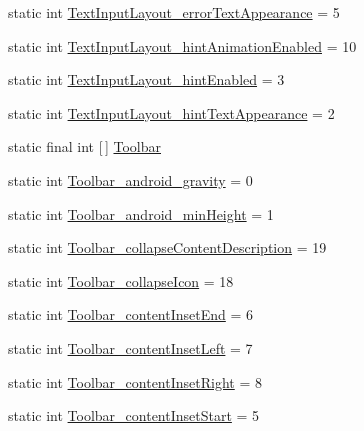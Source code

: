 \begin{DoxyCompactItemize}
static int \hyperlink{classandroid_1_1support_1_1v7_1_1mediarouter_1_1R_1_1styleable_ae6737e6924f3c3da1826890fae0f258b}{Text\+Input\+Layout\+\_\+error\+Text\+Appearance} = 5
\item 
static int \hyperlink{classandroid_1_1support_1_1v7_1_1mediarouter_1_1R_1_1styleable_ac0c7f954fdab6a754ad01fdbc4aeb6ca}{Text\+Input\+Layout\+\_\+hint\+Animation\+Enabled} = 10
\item 
static int \hyperlink{classandroid_1_1support_1_1v7_1_1mediarouter_1_1R_1_1styleable_a3a615e7612252cf50e0e7e212dae5195}{Text\+Input\+Layout\+\_\+hint\+Enabled} = 3
\item 
static int \hyperlink{classandroid_1_1support_1_1v7_1_1mediarouter_1_1R_1_1styleable_ab6a59dd02f3aa6519088694189ebef61}{Text\+Input\+Layout\+\_\+hint\+Text\+Appearance} = 2
\item 
static final int \mbox{[}$\,$\mbox{]} \hyperlink{classandroid_1_1support_1_1v7_1_1mediarouter_1_1R_1_1styleable_a6815cdfaadde30c82b955863af196899}{Toolbar}
\item 
static int \hyperlink{classandroid_1_1support_1_1v7_1_1mediarouter_1_1R_1_1styleable_a3d2dddda90688124695406ed25e401e5}{Toolbar\+\_\+android\+\_\+gravity} = 0
\item 
static int \hyperlink{classandroid_1_1support_1_1v7_1_1mediarouter_1_1R_1_1styleable_a22666f41befa7bb4b75c5c670e5cc5ce}{Toolbar\+\_\+android\+\_\+min\+Height} = 1
\item 
static int \hyperlink{classandroid_1_1support_1_1v7_1_1mediarouter_1_1R_1_1styleable_a9ee92a8c7ef0336e84eb2c6ea27db9d6}{Toolbar\+\_\+collapse\+Content\+Description} = 19
\item 
static int \hyperlink{classandroid_1_1support_1_1v7_1_1mediarouter_1_1R_1_1styleable_a93c3561c7efd4ac1f04f5d87f57da44e}{Toolbar\+\_\+collapse\+Icon} = 18
\item 
static int \hyperlink{classandroid_1_1support_1_1v7_1_1mediarouter_1_1R_1_1styleable_a8f713fe1fbe5422e426d843e644451f3}{Toolbar\+\_\+content\+Inset\+End} = 6
\item 
static int \hyperlink{classandroid_1_1support_1_1v7_1_1mediarouter_1_1R_1_1styleable_a37a31055586c7afd817372e689144033}{Toolbar\+\_\+content\+Inset\+Left} = 7
\item 
static int \hyperlink{classandroid_1_1support_1_1v7_1_1mediarouter_1_1R_1_1styleable_ad92866111ec3cf5e0b183e9fba9b637e}{Toolbar\+\_\+content\+Inset\+Right} = 8
\item 
static int \hyperlink{classandroid_1_1support_1_1v7_1_1mediarouter_1_1R_1_1styleable_a46fac76c3774e9ae389554b7c4485493}{Toolbar\+\_\+content\+Inset\+Start} = 5

\end{DoxyCompactItemize}
